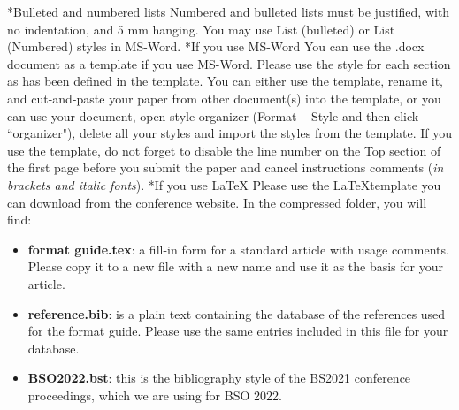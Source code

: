 \documentclass[twocolumn, a4paper,10pt]{article}
\makeatletter
\renewcommand\section{\@startsection{section}{1}{\z@}{3pt}{3pt}{\normalfont\large\bfseries}}
\renewcommand\subsection{\@startsection{subsection}{1}{\z@}{\z@}{\z@}{\normalfont\normalsize\bfseries}}
\renewcommand\subsection{\@startsection{subsection}{1}{\z@}{\z@}{0.1pt}{\normalfont\normalsize\bfseries}}
\makeatother
\begin{document}
\subsection*{Bulleted and numbered lists}
Numbered and bulleted lists must be justified, with no indentation, and 5 mm hanging. You may use List (bulleted) or List (Numbered) styles in MS-Word.
\section*{If you use MS-Word}
You can use the .docx document as a template if you use MS-Word. Please use the style for each section as has been defined in the template. You can either use the template, rename it, and cut-and-paste your paper from other document(s) into the template, or you can use your document, open style organizer (Format – Style and then click ``organizer"), delete all your styles and import the styles from the template.
If you use the template, do not forget to disable the line number on the Top section of the first page before you submit the paper and cancel instructions comments (\textit{in brackets and italic fonts}).
\section*{If you use \LaTeX}
Please use the \LaTeX template you can download from the conference website. In the compressed folder, you will find:
\begin{itemize}
\item \textbf{format guide.tex}: a fill-in form for a standard article with usage comments. Please copy it to a new file with a new name and use it as the basis for your article.
\item \textbf{reference.bib}: is a plain text containing the database of the references used for the format guide. Please use the same entries included in this file for your database.
\item \textbf{BSO2022.bst}: this is the bibliography style of the BS2021 conference proceedings, which we are using for BSO 2022. 
\end{itemize}
\end{document}
